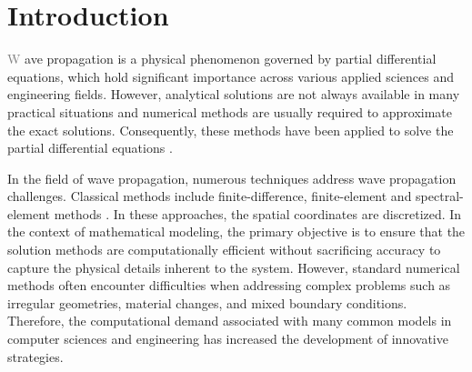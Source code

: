 \documentclass[11pt,twoside]{article}
\begin{document}
\section*{Introduction}\label{sec:introduction}

\lettrine{\textcolor{gray}{W}}{ }ave propagation is a physical phenomenon governed by partial differential equations, 
which hold significant importance across various applied sciences and engineering fields. However, analytical 
solutions are not always available in many practical situations and numerical methods are usually required to 
approximate the exact solutions. Consequently, these methods have been applied to solve the partial differential 
equations \citep{Seriani2020}.

In the field of wave propagation, numerous techniques address wave propagation challenges. Classical methods include 
finite-difference, finite-element and spectral-element methods \citep{Moczo, virieux_review_2011, Igel2017,
komatitsch_introduction_1999,chaljub_spectral-element_2007}. In these approaches, the spatial coordinates are discretized. 
In the context of mathematical modeling, the primary objective is to ensure that the solution methods 
are computationally efficient without sacrificing accuracy to capture the physical details inherent to the 
system. However, standard numerical methods often encounter difficulties when addressing complex problems 
such as irregular geometries, material changes, and mixed boundary conditions. Therefore, the computational 
demand associated with many common models in computer sciences and engineering has increased the development 
of innovative strategies.
\end{document}
